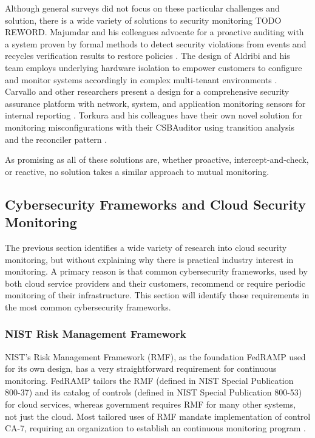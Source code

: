 \documentclass{jdf}
\begin{document}
Although general surveys did not focus on these particular challenges and solution, there is a wide variety of solutions to security monitoring TODO REWORD. Majumdar and his colleagues advocate for a proactive auditing with a system proven by formal methods to detect security violations from events and recycles verification results to restore policies \citeyear[p.~2518]{majumdar22}. The design of Aldribi and his team employs underlying hardware isolation to empower customers to configure and monitor systems accordingly in complex multi-tenant environments \citeyear{aldribi15}. Carvallo and other researchers present a design for a comprehensive security assurance platform with network, system, and application monitoring sensors for internal reporting \citeyear{carvallo17}. Torkura and his colleagues have their own novel solution for monitoring misconfigurations with their CSBAuditor using transition analysis and the reconciler pattern \citeyear{torkura21}.

As promising as all of these solutions are, whether proactive, intercept-and-check, or reactive, no solution takes a similar approach to mutual monitoring.

\subsection{Cybersecurity Frameworks and Cloud Security Monitoring}

The previous section identifies a wide variety of research into cloud security monitoring, but without explaining why there is practical industry interest in monitoring. A primary reason is that common cybersecurity frameworks, used by both cloud service providers and their customers, recommend or require periodic monitoring of their infrastructure. This section will identify those requirements in the most common cybersecurity frameworks.

\subsubsection{NIST Risk Management Framework}

NIST's Risk Management Framework (RMF), as the foundation FedRAMP used for its own design, has a very straightforward requirement for continuous monitoring. FedRAMP tailors the RMF (defined in NIST Special Publication 800-37) and its catalog of controls (defined in NIST Special Publication 800-53) for cloud services, whereas government requires RMF for many other systems, not just the cloud. Most tailored uses of RMF mandate implementation of control CA-7, requiring an organization to establish an continuous monitoring program \citeyear[pp.~90-91]{sp80053r5}.
\end{document}
